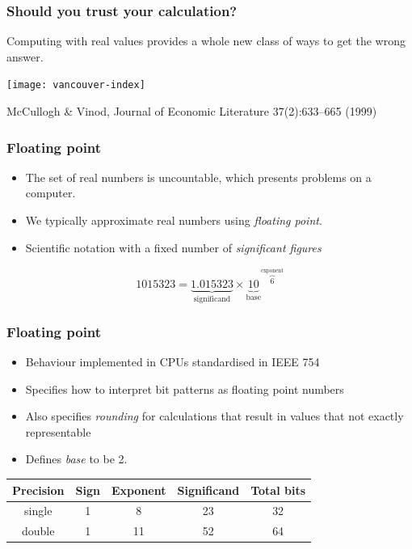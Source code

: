 \documentclass[presentation]{beamer}
\begin{document}
\begin{frame}
  \frametitle{Should you trust your calculation?}

  Computing with real values provides a whole new class of ways to get
  the wrong answer.

  \begin{center}
    \texttt{[image: vancouver-index]}
  \end{center}
  \begin{flushright}
    {\scriptsize McCullogh \& Vinod, Journal of Economic Literature
    37(2):633--665 (1999)}
  \end{flushright}
\end{frame}

\begin{frame}
  \frametitle{Floating point}
  \begin{itemize}
  \item The set of real numbers is uncountable, which presents
    problems on a computer.
  \item We typically approximate real numbers using \emph{floating
      point}.
  \item Scientific notation with a fixed number of
    \emph{significant figures}
  \end{itemize}
  \begin{equation*}
    1015323 = \underbrace{1.015323}_{\text{significand}} \times \underbrace{10}_{\text{base}}\!\!\!\!\!\!^{\overbrace{6}^{\text{exponent}}}
  \end{equation*}
\end{frame}

\begin{frame}
  \frametitle{Floating point}
  \begin{itemize}
  \item Behaviour implemented in CPUs standardised in IEEE 754
  \item Specifies how to interpret bit patterns as floating point
    numbers
  \item Also specifies \emph{rounding} for calculations that result in
    values that not exactly representable
  \item Defines \emph{base} to be 2.
  \end{itemize}
  \begin{tabular}{c|ccc|c}
    Precision & Sign & Exponent & Significand & Total bits \\
    \hline
    single    & 1    & 8        & 23          & 32         \\
    double    & 1    & 11       & 52          & 64         \\
  \end{tabular}
\end{frame}
\end{document}
